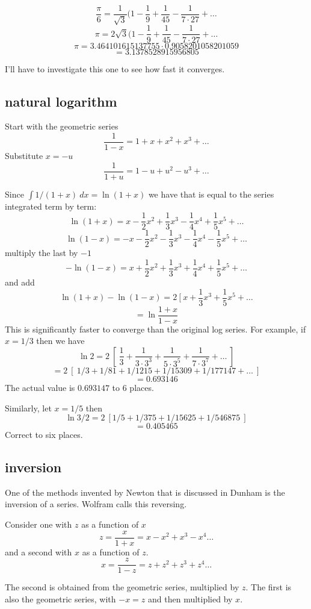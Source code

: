\documentclass[11pt, oneside]{article}
\begin{document}
\[ \frac{\pi}{6} = \frac{1}{\sqrt{3}} (1 - \frac{1}{9} + \frac{1}{45} - \frac{1}{7 \cdot 27} + \dots \]
\[ \pi = 2 \sqrt{3} (1 - \frac{1}{9} + \frac{1}{45} - \frac{1}{7 \cdot 27} + \dots \]
\[ \pi = 3.464101615137755 \cdot 0.9058201058201059 \]
\[ = 3.1378528915956805 \]

I'll have to investigate this one to see how fast it converges.

\subsection*{natural logarithm}
Start with the geometric series
\[ \frac{1}{1 - x} = 1 + x + x^2 + x^3 + \dots \]
Substitute $x = -u$
\[ \frac{1}{1 + u} = 1 - u + u^2 - u^3 + \dots \]

Since $\int 1/(1+x) \ dx = \ln (1+x)$ we have that is equal to the series integrated term by term:
\[ \ln (1 + x) = x - \frac{1}{2} x^2 + \frac{1}{3} x^3 - \frac{1}{4} x^4 + \frac{1}{5} x^5 + \dots \]
\[ \ln (1 - x)= - x - \frac{1}{2} x^2 - \frac{1}{3} x^3 - \frac{1}{4} x^4 - \frac{1}{5} x^5 + \dots \]
multiply the last by $-1$
\[ - \ln (1 - x)= x + \frac{1}{2} x^2 + \frac{1}{3} x^3 + \frac{1}{4} x^4 + \frac{1}{5} x^5 + \dots \]
and add
\[ \ln (1+x) - \ln (1-x) = 2 \ [ \ x + \frac{1}{3} x^3 + \frac{1}{5} x^5 + \dots \]
\[ = \ln \frac{1+x}{1 - x} \]
This is significantly faster to converge than the original log series.  For example, if $x = 1/3$ then we have
\[ \ln 2 = 2 \ [ \ \frac{1}{3} + \frac{1}{3 \cdot 3^3} + \frac{1}{5 \cdot 3^5} + \frac{1}{7 \cdot 3^7} + \dots \ ]  \]
\[ = 2 \ [ \  1/3 + 1/81 + 1/1215 + 1/15309 + 1/177147 + \dots \ ] \]
\[ = 0.693146 \]
The actual value is $0.693147$ to 6 places.

Similarly, let $x = 1/5$ then
\[ \ln 3/2 = 2 \ [ 1/5 + 1/375 + 1/15625 + 1/546875 \ ] \]
\[ = 0.405465 \]
Correct to six places.

\subsection*{inversion}

One of the methods invented by Newton that is discussed in Dunham is the inversion of a series.  Wolfram calls this reversing.  

Consider one with $z$ as a function of $x$
\[ z = \frac{x}{1 + x} = x - x^2 + x^3 - x^4 \dots \]
and a second with $x$ as a function of $z$.
\[ x = \frac{z}{1 - z} = z + z^2 + z^3 + z^4 \dots \]

The second is obtained from the geometric series, multiplied by $z$.  The first is also the geometric series, with $-x = z$ and then multiplied by $x$.
\end{document}
